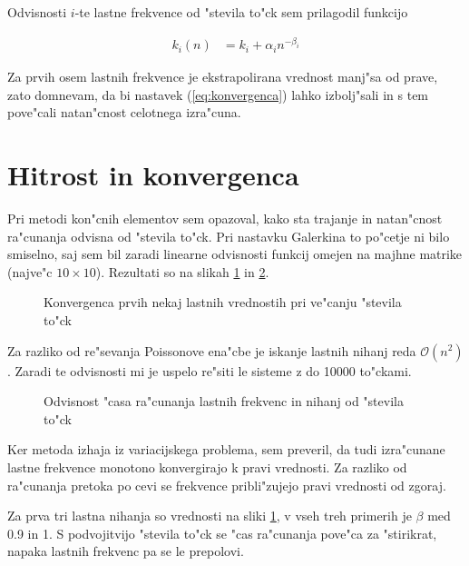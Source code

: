 \documentclass[a4paper,10pt]{article}
\begin{document}
Odvisnosti $i$-te lastne frekvence od "stevila to"ck sem prilagodil funkcijo

\begin{align}
\label{eq:konvergenca}
 k_i(n) &= k_i + \alpha_i n ^{-\beta_i}
\end{align}

Za prvih osem lastnih frekvence je ekstrapolirana vrednost manj"sa od prave, zato domnevam, da bi nastavek (\ref{eq:konvergenca}) lahko izbolj"sali in s tem pove"cali natan"cnost celotnega izra"cuna. 

\section{Hitrost in konvergenca}

Pri metodi kon"cnih elementov sem opazoval, kako sta trajanje in natan"cnost ra"cunanja odvisna od "stevila to"ck. Pri nastavku Galerkina to po"cetje ni bilo smiselno, saj sem bil zaradi linearne odvisnosti funkcij omejen na majhne matrike (najve"c $10\times10$). Rezultati so na slikah \ref{fig:konvergenca} in \ref{fig:hitrost}. 

\begin{figure}[H]
 \centering
 
 \caption{Konvergenca prvih nekaj lastnih vrednostih pri ve"canju "stevila to"ck}
 \label{fig:konvergenca}
\end{figure}

Za razliko od re"sevanja Poissonove ena"cbe je iskanje lastnih nihanj reda $\mathcal{O}(n^2)$. Zaradi te odvisnosti mi je uspelo re"siti le sisteme z do 10000 to"ckami. 

\begin{figure}[H]
 \centering
 
 \caption{Odvisnost "casa ra"cunanja lastnih frekvenc in nihanj od "stevila to"ck}
 \label{fig:hitrost}
\end{figure}

Ker metoda izhaja iz variacijskega problema, sem preveril, da tudi izra"cunane lastne frekvence monotono konvergirajo k pravi vrednosti. Za razliko od ra"cunanja pretoka po cevi se frekvence pribli"zujejo pravi vrednosti od zgoraj. 

Za prva tri lastna nihanja so vrednosti na sliki \ref{fig:konvergenca}, v vseh treh primerih je $\beta$ med 0.9 in 1. S podvojitvijo "stevila to"ck se "cas ra"cunanja pove"ca za "stirikrat, napaka lastnih frekvenc pa se le prepolovi. 
\end{document}
